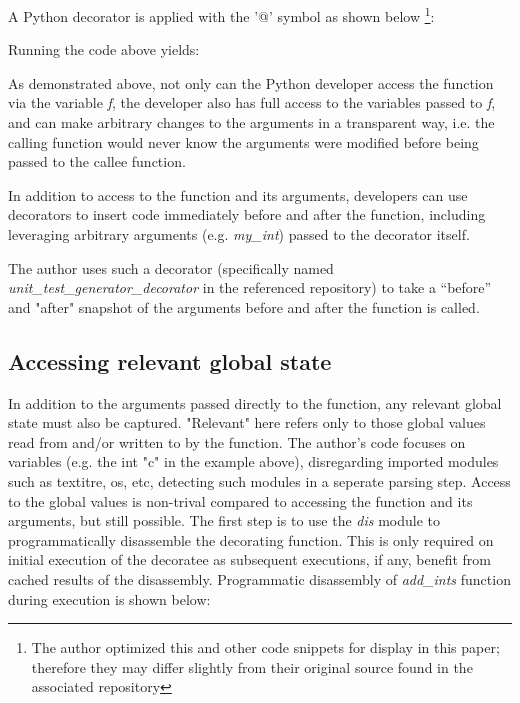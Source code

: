 A Python decorator is applied with the '@' symbol as shown below
\footnote{The author optimized this and other code snippets for display in 
this paper; therefore they may differ slightly from their original 
source found in the associated repository}:



Running the code above yields:



As demonstrated above, not only can the Python developer access the function
via the variable \textit{f}, the developer also has full
access to the variables passed to \textit{f}, and can make 
arbitrary changes to the arguments in a transparent way, 
i.e. the calling function would never know the arguments 
were modified before being passed to the callee function.

In addition to access to the function and its arguments,
developers can use decorators to insert code immediately before and after 
the function, including leveraging arbitrary arguments (e.g.
\textit{my\_int}) passed to the decorator itself.

The author uses such a decorator (specifically named 
\break
\textit{unit\_test\_generator\_decorator} in the referenced repository) to take
 a “before” and "after" snapshot of the arguments
before and after the function is called.

%
\subsection{Accessing relevant global state}\label{sec:approach-internal-2}

In addition to the arguments passed directly to the function, any relevant 
global state must also be captured. "Relevant" here refers only to those 
global values read from and/or written to by the function.
The author's code focuses on variables (e.g. the int "c" in the example above), 
disregarding imported modules such as textit{re, os, etc}, detecting such
modules in a seperate parsing step.
Access to the global values is non-trival compared to accessing the function 
and its arguments, but still possible.  The first step is to use the \textit{dis}
module to programmatically disassemble the decorating function.  This is only 
required on initial execution of the decoratee as subsequent executions, if any, 
benefit from cached results of the disassembly.
Programmatic disassembly of \textit{add\_ints} function during execution is shown below:

